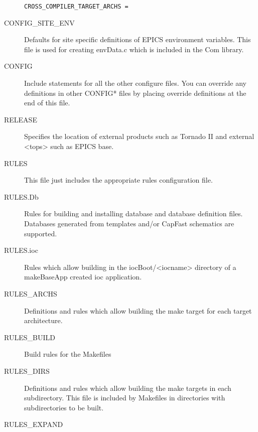 \begin{description}
\verb|CROSS_COMPILER_TARGET_ARCHS =|

\item[CONFIG\_SITE\_ENV] 

Defaults for site specific definitions of EPICS environment variables. This file is used for creating envData.c 
which is included in the Com library.

\item[CONFIG] 

Include statements for all the other configure files. You can override any definitions in other CONFIG* files by 
placing override definitions at the end of this file.

\item[RELEASE] 

Specifies the location of external products such as Tornado II and external \textless{}tops\textgreater{} such as EPICS base. 

\item[RULES] 

This file just includes the appropriate rules configuration file.

\item[RULES.Db] 

Rules for building and installing database and database definition files. Databases generated from templates and/or 
CapFast schematics are supported.

\item[RULES.ioc] 

Rules which allow building in the iocBoot/\textless{}iocname\textgreater{} directory of a makeBaseApp created ioc application.

\item[RULES\_ARCHS] 

Definitions and rules which allow building the make target for each target architecture.

\item[RULES\_BUILD] 

Build rules for the Makefiles 

\item[RULES\_DIRS] 

Definitions and rules which allow building the make targets in each subdirectory. This file is included by Makefiles 
in directories with subdirectories to be built.

\item[RULES\_EXPAND] 


\end{description}
